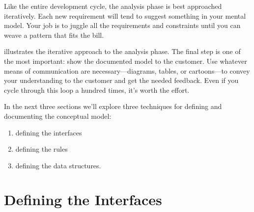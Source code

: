 Like the entire development cycle, the analysis phase is best approached
iteratively. Each new requirement will tend to suggest something in
your mental model. Your job is to juggle all the requirements and
constraints until you can weave a pattern that fits the bill.


 illustrates the iterative approach to the analysis phase.
The final step is one of the most important: show the documented model
to the customer. Use whatever means of communication are
necessary---diagrams, tables, or cartoons---to convey your
understanding to the customer and get the needed feedback. Even if you
cycle through this loop a hundred times, it's worth the effort.

In the next three sections we'll explore three techniques for defining
and documenting the conceptual model:

\begin{enumerate}
\item defining the interfaces
\item defining the rules
\item defining the data structures.
\end{enumerate}%

\section{Defining the Interfaces}%
%
%

